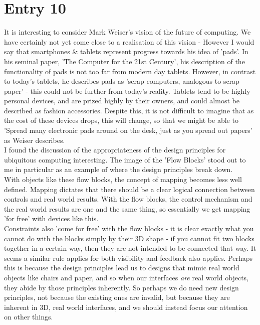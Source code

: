 \documentclass{article}
\begin{document}
\section*{Entry 10}

\noindent It is interesting to consider Mark Weiser's vision of the future of computing. We have certainly not yet come close to a realisation of this vision - However I would say that smartphones \& tablets represent progress towards his idea of 'pads'. In his seminal paper, 'The Computer for the 21st Century', his description of the functionality of pads is not too far from modern day tablets. However, in contrast to today's tablets, he describes pads as 'scrap computers, analogous to scrap paper' - this could not be further from today's reality. Tablets tend to be highly personal devices, and are prized highly by their owners, and could almost be described as fashion accessories. Despite this, it is not difficult to imagine that as the cost of these devices drops, this will change, so that we might be able to 'Spread many electronic pads around on the desk, just as you spread out papers' as Weiser describes.
\\\indent I found the discussion of the appropriateness of the design principles for ubiquitous computing interesting. The image of the 'Flow Blocks' stood out to me in particular as an example of where the design principles break down.
\\\indent With objects like these flow blocks, the concept of mapping becomes less well defined. Mapping dictates that there should be a clear logical connection between controls and real world results. With the flow blocks, the control mechanism and the real world results are one and the same thing, so essentially we get mapping 'for free' with devices like this.
\\\indent Constraints also 'come for free' with the flow blocks - it is clear exactly what you cannot do with the blocks simply by their 3D shape - if you cannot fit two blocks together in a certain way, then they are not intended to be connected that way. It seems a similar rule applies for both visibility and feedback also applies. Perhaps this is because the design principles lead us to designs that mimic real world objects like chairs and paper, and so when our interfaces \emph{are} real world objects, they abide by those principles inherently. So perhaps we do need new design principles, not because the existing ones are invalid, but because they are inherent in 3D, real world interfaces, and we should instead focus our attention on other things.
\end{document}
